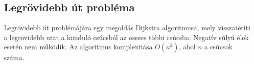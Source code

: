 \subsection{Legrövidebb út probléma}

Legrövidebb út problémájára egy megoldás Dijkstra algoritmusa, mely visszatéríti a legrövidebb utat a kiinduló csúcsból az összes többi csúcsba. Negatív súlyú élek esetén nem működik. Az algoritmus komplexitása \(O(n^2)\), ahol \(n\) a csúcsok száma.

